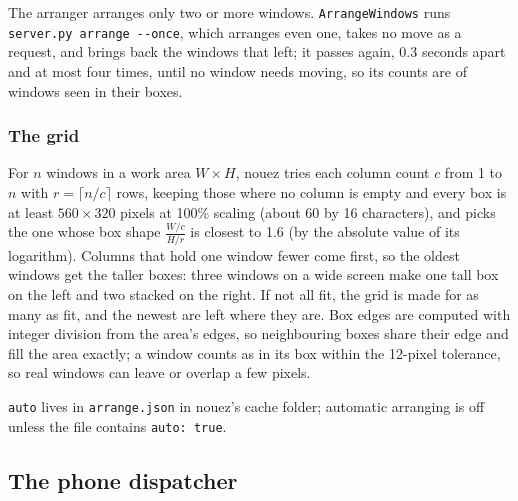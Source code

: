 \documentclass[10pt,a4paper]{article}
\newcommand{\code}[1]{\texttt{#1}}
\begin{document}
The arranger arranges only two or more windows. \code{ArrangeWindows} runs
\code{server.py arrange -{}-once}, which arranges even one, takes no move as a request, and brings
back the windows that left; it passes again, 0.3 seconds apart and at most four times, until no
window needs moving, so its counts are of windows seen in their boxes.

\subsubsection*{The grid}

For $n$ windows in a work area $W \times H$, nouez tries each column count $c$ from 1 to $n$ with
$r = \lceil n / c \rceil$ rows, keeping those where no column is empty and every box is at least
$560 \times 320$ pixels at 100\% scaling (about 60 by 16 characters), and picks the one whose box
shape $\frac{W/c}{H/r}$ is closest to 1.6 (by the absolute value of its logarithm). Columns
that hold one window fewer come first, so the oldest windows get the taller boxes: three windows
on a wide screen make one tall box on the left and two stacked on the right. If not all fit, the
grid is made for as many as fit, and the newest are left where they are. Box edges are computed
with integer division from the area's edges, so neighbouring boxes share their edge and fill the
area exactly; a window counts as in its box within the 12-pixel tolerance, so real windows can
leave or overlap a few pixels.

\code{auto} lives in \code{arrange.json} in nouez's cache folder; automatic arranging is off unless the file contains
\code{auto: true}.

\subsection{The phone dispatcher}
\label{sec:dispatcher}
\end{document}

